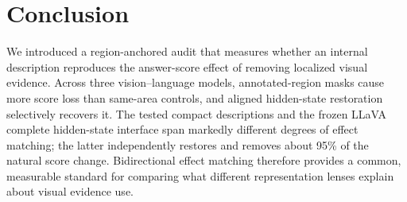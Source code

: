 \section{Conclusion}

We introduced a region-anchored audit that measures whether an internal description reproduces the answer-score effect of removing localized visual evidence. Across three vision--language models, annotated-region masks cause more score loss than same-area controls, and aligned hidden-state restoration selectively recovers it. The tested compact descriptions and the frozen LLaVA complete hidden-state interface span markedly different degrees of effect matching; the latter independently restores and removes about 95\% of the natural score change. Bidirectional effect matching therefore provides a common, measurable standard for comparing what different representation lenses explain about visual evidence use.
